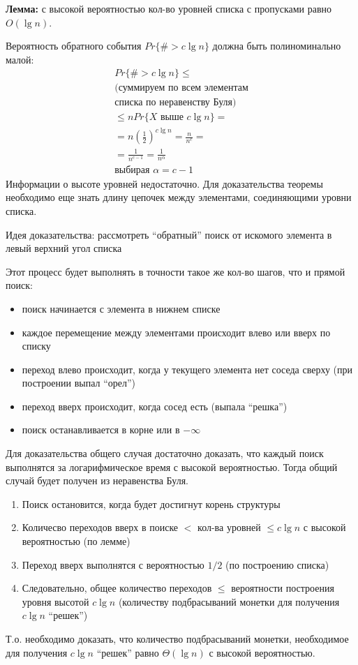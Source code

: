 \documentclass[11pt]{article}
\begin{document}
\textbf{Лемма:} с высокой вероятностью кол-во уровней списка с пропусками равно $O(\lg n)$. 

Вероятность обратного события $Pr\{\# > c\lg n\}$ должна быть полиноминально малой:
\begin{align*}
  Pr\{\# > c \lg n \} \leqslant \\
  \text{(суммируем по всем элементам} \\
  \text{списка по неравенству Буля)} \\
  \leqslant n Pr\{X \text{ выше }c \lg n\} = \\
  = n {\left(\frac{1}{2}\right)}^{c\lg n} = \frac{n}{n^c} = \\
  = \frac{1}{n^{c-1}} = \frac{1}{n^\alpha} \\
  \text{выбирая }\alpha = c-1
\end{align*}
Информации о высоте уровней недостаточно. Для доказательства теоремы необходимо еще знать длину цепочек между элементами, соединяющими уровни списка.

Идея доказательства: рассмотреть ``обратный'' поиск от искомого элемента в левый верхний угол списка

Этот процесс будет выполнять в точности такое же кол-во шагов, что и прямой поиск:
\begin{itemize}
\item поиск начинается с элемента в нижнем списке
\item каждое перемещение между элементами происходит влево или вверх по списку
\item переход влево происходит, когда у текущего элемента нет соседа сверху (при построении выпал ``орел'')
\item переход вверх происходит, когда сосед есть (выпала ``решка'')
\item поиск останавливается в корне или в $-\infty$
\end{itemize}
Для доказательства общего случая достаточно доказать, что каждый поиск выполнятся за логарифмическое время с высокой вероятностью. Тогда общий случай будет получен из неравенства Буля.
\begin{enumerate}
\item Поиск остановится, когда будет достигнут корень структуры
\item Количесво переходов вверх в поиске $<$ кол-ва уровней $\leqslant c \lg n$ с высокой вероятностью (по лемме)
\item Переход вверх выполнятся с вероятностью $1/2$ (по построению списка)
\item Следовательно, общее количество переходов $\leqslant$ вероятности построения уровня высотой $c \lg n$ (количеству подбрасываний монетки для получения $c \lg n$ ``решек'')
\end{enumerate}
Т.о. необходимо доказать, что количество подбрасываний монетки, необходимое для получения $c \lg n$ ``решек'' равно $\Theta(\lg n)$ с высокой вероятностью.
\end{document}

